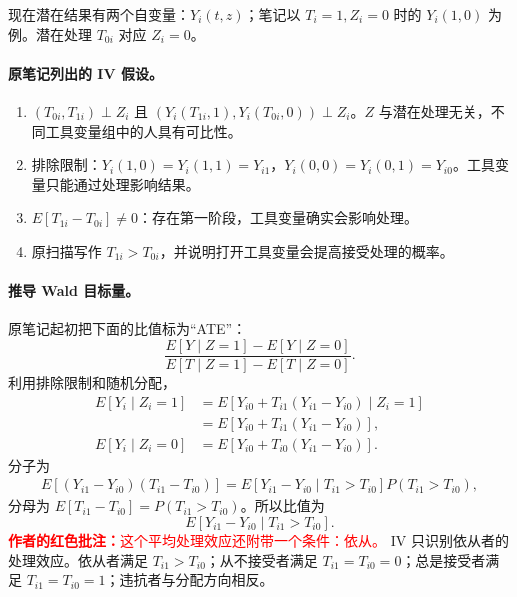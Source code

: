 \documentclass[11pt,a4paper]{article}
\newcommand{\inkred}[1]{\textcolor{red}{#1}}
\begin{document}
{现在潜在结果有两个自变量：$Y_i(t,z)$；笔记以 $T_i=1,Z_i=0$ 时的 $Y_i(1,0)$ 为例。潜在处理 $T_{0i}$ 对应 $Z_i=0$。
\paragraph{原笔记列出的 IV 假设。}
\begin{enumerate}
\item $(T_{0i},T_{1i})\perp Z_i$ 且 $(Y_i(T_{1i},1),Y_i(T_{0i},0))\perp Z_i$。$Z$ 与潜在处理无关，不同工具变量组中的人具有可比性。
\item 排除限制：$Y_i(1,0)=Y_i(1,1)=Y_{i1}$，$Y_i(0,0)=Y_i(0,1)=Y_{i0}$。工具变量只能通过处理影响结果。
\item $E[T_{1i}-T_{0i}]\ne0$：存在第一阶段，工具变量确实会影响处理。
\item 原扫描写作 $T_{1i}>T_{0i}$，并说明打开工具变量会提高接受处理的概率。
\end{enumerate}

\paragraph{推导 Wald 目标量。}
原笔记起初把下面的比值标为“ATE”：
\[\frac{E[Y\mid Z=1]-E[Y\mid Z=0]}{E[T\mid Z=1]-E[T\mid Z=0]}.\]
利用排除限制和随机分配，
\begin{align*}
E[Y_i\mid Z_i=1]&=E[Y_{i0}+T_{i1}(Y_{i1}-Y_{i0})\mid Z_i=1]\\
&=E[Y_{i0}+T_{i1}(Y_{i1}-Y_{i0})],\\
E[Y_i\mid Z_i=0]&=E[Y_{i0}+T_{i0}(Y_{i1}-Y_{i0})].
\end{align*}
分子为
\begin{align*}
E[(Y_{i1}-Y_{i0})(T_{i1}-T_{i0})]
=E[Y_{i1}-Y_{i0}\mid T_{i1}>T_{i0}]P(T_{i1}>T_{i0}),
\end{align*}
分母为 $E[T_{i1}-T_{i0}]=P(T_{i1}>T_{i0})$。所以比值为
\[E[Y_{i1}-Y_{i0}\mid T_{i1}>T_{i0}].\]
\inkred{\textbf{作者的红色批注：}这个平均处理效应还附带一个条件：依从。} IV 只识别依从者的处理效应。依从者满足 $T_{i1}>T_{i0}$；从不接受者满足 $T_{i1}=T_{i0}=0$；总是接受者满足 $T_{i1}=T_{i0}=1$；违抗者与分配方向相反。

}
\end{document}
